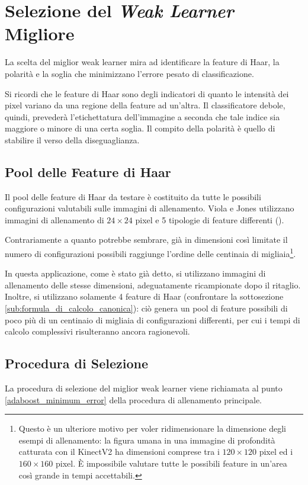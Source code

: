     \section{Selezione del \emph{Weak Learner} Migliore}
    \label{sec:weak_learner}
        La scelta del miglior weak learner mira ad identificare la feature di Haar, la polarità e la soglia che minimizzano l'errore pesato di classificazione.

        Si ricordi che le feature di Haar sono degli indicatori di quanto le intensità dei pixel variano da una regione della feature ad un'altra. 
        Il classificatore debole, quindi, prevederà l'etichettatura dell'immagine a seconda che tale indice sia maggiore o minore di una certa soglia. 
        Il compito della polarità è quello di stabilire il verso della diseguaglianza.

        \subsection{Pool delle Feature di Haar} %
        \label{sub:features_pool}
            Il pool delle feature di Haar da testare è costituito da tutte le possibili configurazioni valutabili sulle immagini di allenamento.
            Viola e Jones utilizzano immagini di allenamento di $24 \times 24$ pixel e 5 tipologie di feature differenti (\cite[sezione 2.2]{Viola04}).

            Contrariamente a quanto potrebbe sembrare, già in dimensioni così limitate il numero di configurazioni possibili raggiunge l'ordine delle centinaia di migliaia\footnote{Questo è un ulteriore motivo per voler ridimensionare la dimensione degli esempi di allenamento: la figura umana in una immagine di profondità catturata con il KinectV2 ha dimensioni comprese tra i $120 \times 120$ pixel ed i $160 \times 160$ pixel. È impossibile valutare tutte le possibili feature in un'area così grande in tempi accettabili.}.

            In questa applicazione, come è stato già detto, si utilizzano immagini di allenamento delle stesse dimensioni, adeguatamente ricampionate dopo il ritaglio.
            Inoltre, si utilizzano solamente 4 feature di Haar (confrontare la sottosezione \ref{sub:formula_di_calcolo_canonica}): ciò genera un pool di feature possibili di poco più di un centinaio di migliaia di configurazioni differenti, per cui i tempi di calcolo complessivi risulteranno ancora ragionevoli.

        \subsection{Procedura di Selezione} %
        \label{sub:weak_learner_selection_procedure}
            La procedura di selezione del miglior weak learner viene richiamata al punto \ref{adaboost_minimum_error} della procedura di allenamento principale.

